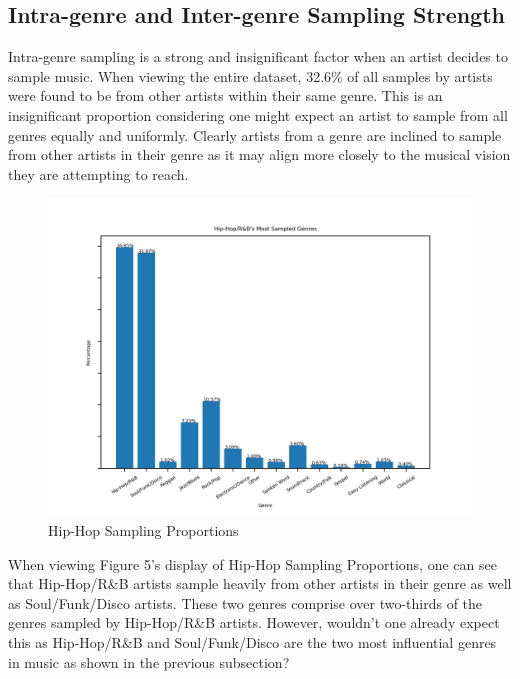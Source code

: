 \documentclass[pageno]{jpaper}
\begin{document}
\subsection{Intra-genre and Inter-genre Sampling Strength}
Intra-genre sampling is a strong and insignificant factor when an artist decides to sample music. When viewing the entire dataset, 32.6\% of all samples by artists were found to be from other artists within their same genre. This is an insignificant proportion considering one might expect an artist to sample from all genres equally and uniformly. Clearly artists from a genre are inclined to sample from other artists in their genre as it may align more closely to the musical vision they are attempting to reach.
\begin{figure}[H]
\includegraphics{./genreRatio/genreRatioHiphop}
\caption{Hip-Hop Sampling Proportions}
\label{fig:fig5}
\centering
\end{figure}
When viewing Figure 5's display of Hip-Hop Sampling Proportions, one can see that Hip-Hop/R\&B artists sample heavily from other artists in their genre as well as Soul/Funk/Disco artists. These two genres comprise over two-thirds of the genres sampled by Hip-Hop/R\&B artists. However, wouldn't one already expect this as Hip-Hop/R\&B and Soul/Funk/Disco are the two most influential genres in music as shown in the previous subsection?
\end{document}
